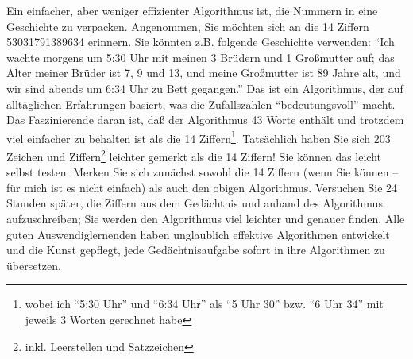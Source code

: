 Ein einfacher, aber weniger effizienter Algorithmus ist, die Nummern in eine Geschichte zu verpacken.
Angenommen, Sie möchten sich an die 14 Ziffern 53031791389634 erinnern.
Sie könnten z.B. folgende Geschichte verwenden: \enquote{Ich wachte morgens um 5:30 Uhr mit meinen 3 Brüdern und 1 Großmutter auf; das Alter meiner Brüder ist 7, 9 und 13, und meine Großmutter ist 89 Jahre alt, und wir sind abends um 6:34 Uhr zu Bett gegangen.}
Das ist ein Algorithmus, der auf alltäglichen Erfahrungen basiert, was die Zufallszahlen \enquote{bedeutungsvoll} macht.
Das Faszinierende daran ist, daß der Algorithmus 43 Worte enthält und trotzdem viel einfacher zu behalten ist als die 14 Ziffern\footnote{wobei ich \enquote{5:30 Uhr} und \enquote{6:34 Uhr} als \enquote{5 Uhr 30} bzw. \enquote{6 Uhr 34} mit jeweils 3 Worten gerechnet habe}.
Tatsächlich haben Sie sich 203 Zeichen und Ziffern\footnote{inkl. Leerstellen und Satzzeichen} leichter gemerkt als die 14 Ziffern!
Sie können das leicht selbst testen.
Merken Sie sich zunächst sowohl die 14 Ziffern (wenn Sie können -- für mich ist es nicht einfach) als auch den obigen Algorithmus.
Versuchen Sie 24 Stunden später, die Ziffern aus dem Gedächtnis und anhand des Algorithmus aufzuschreiben; Sie werden den Algorithmus viel leichter und genauer finden.
Alle guten Auswendiglernenden haben unglaublich effektive Algorithmen entwickelt und die Kunst gepflegt, jede Gedächtnisaufgabe sofort in ihre Algorithmen zu übersetzen.

